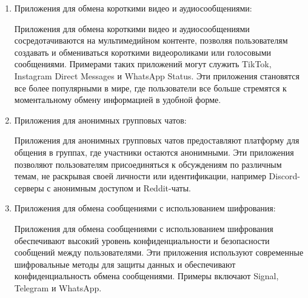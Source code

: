 \begin{enumerate}
	\item Приложения для обмена короткими видео и аудиосообщениями:
	
	Приложения для обмена короткими видео и аудиосообщениями сосредотачиваются на мультимедийном контенте, позволяя пользователям создавать и обмениваться короткими видеороликами или голосовыми сообщениями. Примерами таких приложений могут служить TikTok, Instagram Direct Messages и WhatsApp Status. Эти приложения становятся все более популярными в мире, где пользователи все больше стремятся к моментальному обмену информацией в удобной форме.
	
	\item Приложения для анонимных групповых чатов:
	
	Приложения для анонимных групповых чатов предоставляют платформу для общения в группах, где участники остаются анонимными. Эти приложения позволяют пользователям присоединяться к обсуждениям по различным темам, не раскрывая своей личности или идентификации, например Discord-серверы с анонимным доступом и Reddit-чаты.
	
	\item Приложения для обмена сообщениями с использованием шифрования:
	
	Приложения для обмена сообщениями с использованием шифрования обеспечивают высокий уровень конфиденциальности и безопасности сообщений между пользователями. Эти приложения используют современные шифровальные методы для защиты данных и обеспечивают конфиденциальность обмена сообщениями. Примеры включают Signal, Telegram и WhatsApp.
\end{enumerate}